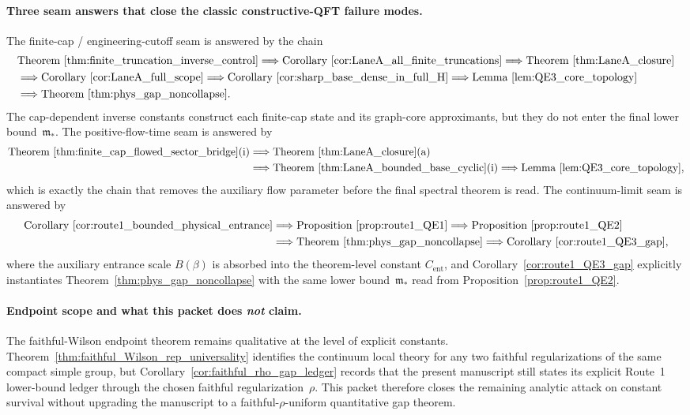\paragraph{Three seam answers that close the classic constructive-QFT failure modes.}
The finite-cap / engineering-cutoff seam is answered by the chain
\[
\begin{aligned}
&\text{Theorem~\ref{thm:finite_truncation_inverse_control}}
\Longrightarrow
\text{Corollary~\ref{cor:LaneA_all_finite_truncations}}
\Longrightarrow
\text{Theorem~\ref{thm:LaneA_closure}}\\
&\Longrightarrow
\text{Corollary~\ref{cor:LaneA_full_scope}}
\Longrightarrow
\text{Corollary~\ref{cor:sharp_base_dense_in_full_H}}
\Longrightarrow
\text{Lemma~\ref{lem:QE3_core_topology}}\\
&\Longrightarrow
\text{Theorem~\ref{thm:phys_gap_noncollapse}}.
\end{aligned}
\]
The cap-dependent inverse constants construct each finite-cap state and its graph-core approximants, but they do not enter the final lower bound~$\mathfrak m_\ast$.
The positive-flow-time seam is answered by
\[
\begin{aligned}
\text{Theorem~\ref{thm:finite_cap_flowed_sector_bridge}(i)}
&\Longrightarrow
\text{Theorem~\ref{thm:LaneA_closure}(a)}\\
&\Longrightarrow
\text{Theorem~\ref{thm:LaneA_bounded_base_cyclic}(i)}
\Longrightarrow
\text{Lemma~\ref{lem:QE3_core_topology}},
\end{aligned}
\]
which is exactly the chain that removes the auxiliary flow parameter before the final spectral theorem is read.
The continuum-limit seam is answered by
\[
\begin{aligned}
\text{Corollary~\ref{cor:route1_bounded_physical_entrance}}
&\Longrightarrow
\text{Proposition~\ref{prop:route1_QE1}}
\Longrightarrow
\text{Proposition~\ref{prop:route1_QE2}}\\
&\Longrightarrow
\text{Theorem~\ref{thm:phys_gap_noncollapse}}
\Longrightarrow
\text{Corollary~\ref{cor:route1_QE3_gap}},
\end{aligned}
\]
where the auxiliary entrance scale $B(\beta)$ is absorbed into the theorem-level constant $C_{\mathrm{ent}}$, and Corollary~\ref{cor:route1_QE3_gap} explicitly instantiates Theorem~\ref{thm:phys_gap_noncollapse} with the same lower bound~$\mathfrak m_\ast$ read from Proposition~\ref{prop:route1_QE2}.

\paragraph{Endpoint scope and what this packet does \emph{not} claim.}
The faithful-Wilson endpoint theorem remains qualitative at the level of explicit constants.
Theorem~\ref{thm:faithful_Wilson_rep_universality} identifies the continuum local theory for any two faithful regularizations of the same compact simple group, but Corollary~\ref{cor:faithful_rho_gap_ledger} records that the present manuscript still states its explicit Route~1 lower-bound ledger through the chosen faithful regularization~$\rho$.
This packet therefore closes the remaining analytic attack on constant survival without upgrading the manuscript to a faithful-$\rho$-uniform quantitative gap theorem.

